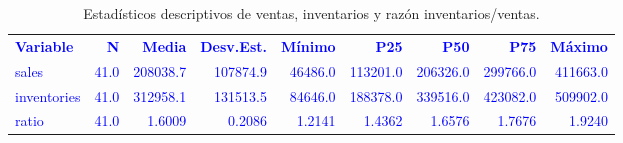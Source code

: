 \begin{table}[H]
\centering
\caption{Estadísticos descriptivos de ventas, inventarios y razón inventarios/ventas.}
\label{tab:ex8_desc}
\begin{tabular}{lrrrrrrrr}
\rowcolor{blue!10}
\toprule
\rowcolor{blue!20}
\textcolor{blue}{\textbf{Variable}} & \textcolor{blue}{\textbf{N}} & \textcolor{blue}{\textbf{Media}} & \textcolor{blue}{\textbf{Desv.Est.}} & \textcolor{blue}{\textbf{Mínimo}} & \textcolor{blue}{\textbf{P25}} & \textcolor{blue}{\textbf{P50}} & \textcolor{blue}{\textbf{P75}} & \textcolor{blue}{\textbf{Máximo}} \\
\addlinespace
\rowcolor{blue!10}
\textcolor{blue}{sales} & \textcolor{blue}{41.0} & \textcolor{blue}{208038.7} & \textcolor{blue}{107874.9} & \textcolor{blue}{46486.0} & \textcolor{blue}{113201.0} & \textcolor{blue}{206326.0} & \textcolor{blue}{299766.0} & \textcolor{blue}{411663.0} \\
\rowcolor{blue!10}
\textcolor{blue}{inventories} & \textcolor{blue}{41.0} & \textcolor{blue}{312958.1} & \textcolor{blue}{131513.5} & \textcolor{blue}{84646.0} & \textcolor{blue}{188378.0} & \textcolor{blue}{339516.0} & \textcolor{blue}{423082.0} & \textcolor{blue}{509902.0} \\
\rowcolor{blue!10}
\textcolor{blue}{ratio} & \textcolor{blue}{41.0} & \textcolor{blue}{1.6009} & \textcolor{blue}{0.2086} & \textcolor{blue}{1.2141} & \textcolor{blue}{1.4362} & \textcolor{blue}{1.6576} & \textcolor{blue}{1.7676} & \textcolor{blue}{1.9240} \\
\bottomrule
\end{tabular}
\end{table}
